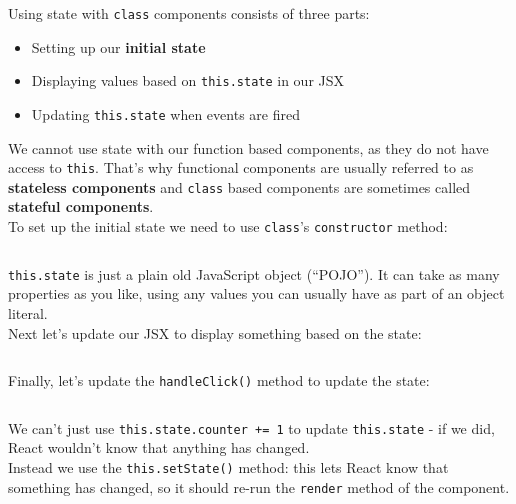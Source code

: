 Using state with \texttt{class} components consists of three parts:

\begin{itemize}
    \item Setting up our \textbf{initial state}
    \item Displaying values based on \texttt{this.state} in our JSX
    \item Updating \texttt{this.state} when events are fired
\end{itemize}

We cannot use state with our function based components, as they do not have access to \texttt{this}. That's why functional components are usually referred to as \textbf{stateless components} and \texttt{class} based components are sometimes called \textbf{stateful components}.
\\

To set up the initial state we need to use \texttt{class}'s \texttt{constructor} method:

\inputminted{jsx}{04-state/figures/05-initial-state.jsx}

\texttt{this.state} is just a plain old JavaScript object (``POJO''). It can take as many properties as you like, using any values you can usually have as part of an object literal.
\\

Next let's update our JSX to display something based on the state:

\inputminted{jsx}{04-state/figures/06-state-jsx.jsx}

Finally, let's update the \texttt{handleClick()} method to update the state:

\inputminted{jsx}{04-state/figures/07-state-change.jsx}

We can't just use \texttt{this.state.counter += 1} to update \texttt{this.state} - if we did, React wouldn't know that anything has changed.
\\

Instead we use the \texttt{this.setState()} method: this lets React know that something has changed, so it should re-run the \texttt{render} method of the component.

